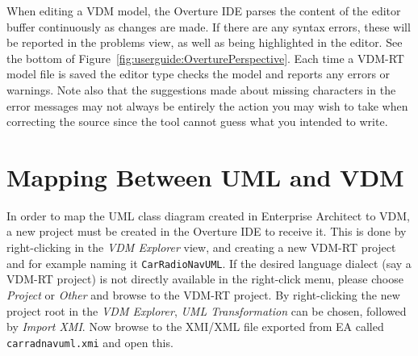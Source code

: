 When editing a VDM model, the Overture IDE parses the content of the
editor buffer continuously as changes are made. If there are any
syntax errors, these will be reported in the problems view, as well as
being highlighted in the editor. See the bottom of
Figure~\ref{fig:userguide:OverturePerspective}. Each time a
VDM-RT model file is saved the editor type checks the model and reports
any errors or warnings. Note also that the suggestions made about
missing characters in the
error messages may not always be entirely the action you may wish to
take when correcting the source since the tool cannot guess what you
intended to write.




\section{Mapping Between UML and  VDM}\label{sec:fromUMLtoVDM}\label{sec:syntaxcheck}
\label{sec:typecheck}

In order to map the UML class diagram created in Enterprise Architect
to VDM, a new project must be created in the Overture IDE to receive
it. This is done by right-clicking in the \emph{VDM Explorer} view,
and creating a new VDM-RT project and for example naming it
\texttt{CarRadioNavUML}. If the desired language dialect (say a VDM-RT 
project) is not directly available in the right-click menu, please choose
\emph{Project} or 
\emph{Other} and browse to the VDM-RT project. By right-clicking the new 
project root in the \emph{VDM Explorer}, \emph{UML Transformation} can 
be chosen, followed by \emph{Import XMI}. Now browse to the XMI/XML file
exported from EA called \texttt{carradnavuml.xmi} and open this.

